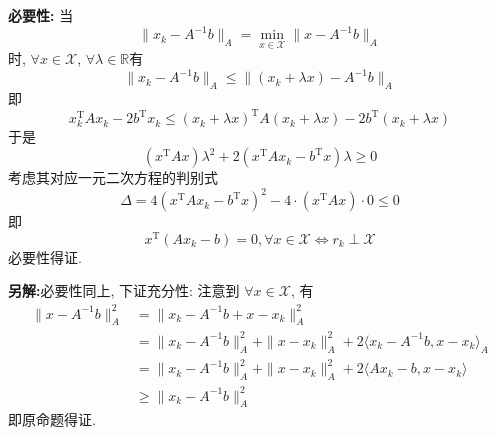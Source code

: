 \documentclass[12pt, answers]{exam}     %
\newcommand{\anothersolution}{\par\noindent\textbf{另解:}}
\newcommand{\R}{\mathbb{R}}
\newcommand{\T}{\mathrm{T}}
\begin{document}
\begin{questions}
\begin{solution}
\textbf{必要性:}
当
\[
\| x_k - A^{-1} b \|_A = \min_{x \in \mathcal{X}} \| x - A^{-1} b \|_A
\]
时, \( \forall x \in \mathcal{X} \), \( \forall \lambda \in \R \)有
\[
\| x_k - A^{-1} b \|_A \leq \| (x_k + \lambda x) - A^{-1} b \|_A 
\]
即
\[
x_k^{\T} A x_k - 2 b^{\T} x_k \leq (x_k + \lambda x)^{\T} A (x_k + \lambda x) - 2 b^{\T} (x_k + \lambda x)
\]
于是
\[
(x^{\T} A x) \lambda^2 + 2 (x^{\T} A x_k - b^{\T} x) \lambda \geq 0
\]
考虑其对应一元二次方程的判别式
\[
\Delta = 4 (x^{\T} A x_k- b^{\T} x)^2 - 4 \cdot (x^{\T} A x) \cdot 0 \leq 0
\]  
即
\[
x^{\T}(Ax_k-b) = 0, \forall x \in \mathcal{X} \Leftrightarrow r_k \perp \mathcal{X}
\]
必要性得证. 

\anothersolution{}必要性同上, 下证充分性: 注意到 \( \forall x \in \mathcal{X} \), 有
\begin{align*}
\| x - A^{-1} b \|_A^2 &= \| x_k - A^{-1} b + x - x_k \|_A^2   \\
&= \| x_k - A^{-1} b \|_A^2 + \| x - x_k \|_A^2 + 2 \langle x_k - A^{-1} b, x - x_k\rangle_A  \\
&= \| x_k - A^{-1} b \|_A^2 + \| x - x_k \|_A^2 + 2 \langle Ax_k - b, x - x_k\rangle  \\
&\geq \| x_k - A^{-1} b \|_A^2
\end{align*}
即原命题得证. 

\end{solution}



\end{questions}
\end{document}
